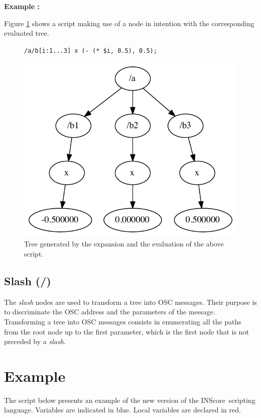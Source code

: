 \documentclass{article}
\newcommand{\IS}		{INScore}
\newcommand{\exemple}	{\vspace*{1mm}\hspace*{-4mm}\textbf{Example :}}
\newcommand{\code}	[2][0.9]		{\vspace{0mm}\begin{center}\colorbox{mygrey}{
							\begin{minipage}[t]{#1\columnwidth} 
							{\small \texttt{#2}}
							\end{minipage}}\end{center}}
\begin{document}
\exemple

Figure \ref{treesample3} shows a script making use of a node in intention with the corresponding evaluated tree.

\begin{figure}[htbp]
\code{/a/b[i:1...3] x (- (* \$i, 0.5), 0.5);}
\begin{center}
\includegraphics[width=0.8\columnwidth]{eval/sample2}
\caption{Tree generated by the expansion and the evaluation of the above script.}
\label{treesample3}
\end{center}
\end{figure}

\subsection{Slash (/)}\label{ssec:slash}

The \emph{slash} nodes are used to transform a tree into OSC messages. Their purpose is to discriminate the OSC address and the parameters of the message. Transforming a tree into OSC messages consists in enumerating all the paths from the root node up to the first parameter, which is the first node that is not preceded by a \emph{slash}.



\section{Example}

The script below presents an example of the new version of the \IS\ scripting language. Variables are indicated in blue. Local variables are declared in red.
\end{document}

